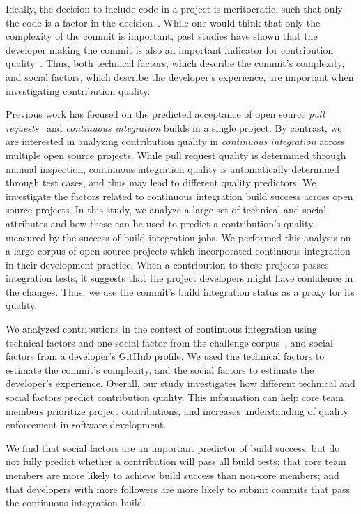 \documentclass[10pt, conference]{IEEEtran}
\begin{document}
Ideally, the decision to include code in
a project is meritocratic, such that only the code is a factor
in the decision~\cite{Scacchi07}.
While one would think that only the complexity of the commit is important, past
studies have shown that the developer making the commit is also an important
indicator for contribution quality~\cite{tsay14icse, tsay14fse}.
Thus, both technical factors, which describe the commit's complexity, and
social factors, which describe the developer's experience, are important when
investigating contribution quality.

Previous work has focused on the predicted acceptance of open source \emph{pull
requests}~\cite{tsay14icse, tsay14fse} and \emph{continuous integration} builds
in a single project.
By contrast,  we are interested in analyzing contribution quality 
in \emph{continuous integration} across multiple open source projects.  While 
pull request
quality is determined through manual inspection, continuous integration quality
is automatically determined through test cases, and thus may lead to different
quality predictors. 
We investigate the factors related to continuous integration build success
across open source projects.
In this study, we analyze a large set of technical and social attributes 
and how these can be used to predict a contribution's quality, measured by the
success of build integration jobs.
We performed this analysis on a large corpus of open source projects
which incorporated continuous integration in their development practice. 
When a contribution to these projects passes integration tests, 
it suggests that the project developers
might have confidence in the changes. 
Thus, we use the commit's build integration status as a proxy for its quality.

We analyzed contributions in the 
context of continuous integration using technical factors and one social
factor from the challenge
corpus~\cite{msr17challenge}, and social factors from a developer's
GitHub profile.  We used the technical factors to estimate the commit's
complexity, and the social factors to estimate the developer's experience.
Overall, our study investigates how different technical and social factors predict
contribution quality. This information can help core team members prioritize project
contributions, and increases understanding of quality enforcement
in software development.

We find that social factors are an important predictor of build success,
but do not fully predict whether a contribution will 
pass all build tests;
that core team members are more likely to achieve build success than non-core
members; and that developers with more followers are more likely to submit 
commits that pass the
continuous integration build.
\end{document}
